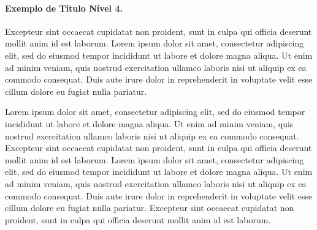 \paragraph{Exemplo de Título Nível 4.}

Excepteur sint occaecat cupidatat non proident, sunt in culpa qui officia deserunt mollit anim id est laborum. Lorem ipsum dolor sit amet, consectetur adipiscing elit, sed do eiusmod tempor incididunt ut labore et dolore magna aliqua. Ut enim ad minim veniam, quis nostrud exercitation ullamco laboris nisi ut aliquip ex ea commodo consequat. Duis aute irure dolor in reprehenderit in voluptate velit esse cillum dolore eu fugiat nulla pariatur. 

Lorem ipsum dolor sit amet, consectetur adipiscing elit, sed do eiusmod tempor incididunt ut labore et dolore magna aliqua. Ut enim ad minim veniam, quis nostrud exercitation ullamco laboris nisi ut aliquip ex ea commodo consequat. Excepteur sint occaecat cupidatat non proident, sunt in culpa qui officia deserunt mollit anim id est laborum. Lorem ipsum dolor sit amet, consectetur adipiscing elit, sed do eiusmod tempor incididunt ut labore et dolore magna aliqua. Ut enim ad minim veniam, quis nostrud exercitation ullamco laboris nisi ut aliquip ex ea commodo consequat. Duis aute irure dolor in reprehenderit in voluptate velit esse cillum dolore eu fugiat nulla pariatur. Excepteur sint occaecat cupidatat non proident, sunt in culpa qui officia deserunt mollit anim id est laborum.
